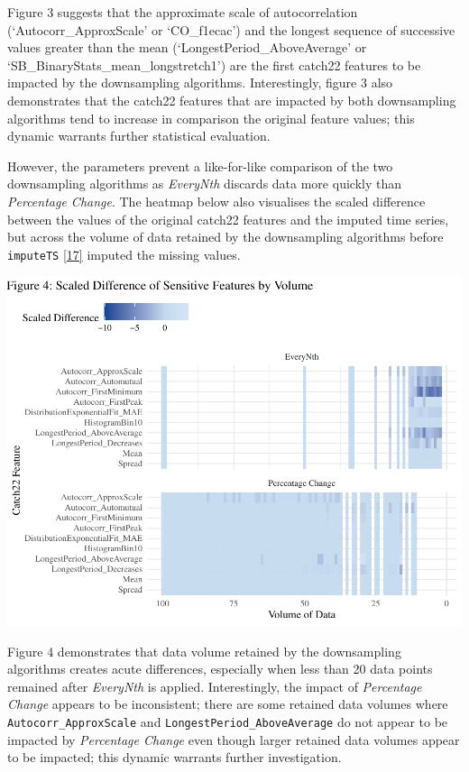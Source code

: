 \documentclass{article}
\begin{document}
Figure 3 suggests that the approximate scale of autocorrelation
(`Autocorr\_ApproxScale' or `CO\_f1ecac') and the longest sequence of
successive values greater than the mean (`LongestPeriod\_AboveAverage'
or `SB\_BinaryStats\_mean\_longstretch1') are the first catch22 features
to be impacted by the downsampling algorithms. Interestingly, figure 3
also demonstrates that the catch22 features that are impacted by both
downsampling algorithms tend to increase in comparison the original
feature values; this dynamic warrants further statistical evaluation.

However, the parameters prevent a like-for-like comparison of the two
downsampling algorithms as \emph{EveryNth} discards data more quickly
than \emph{Percentage Change}. The heatmap below also visualises the
scaled difference between the values of the original catch22 features
and the imputed time series, but across the volume of data retained by
the downsampling algorithms before \texttt{imputeTS}
\protect\hyperlink{ref-imputeTS_R}{{[}17{]}} imputed the missing values.

\includegraphics{210431461_CSC8639_Dissertation_files/figure-latex/Heatmap_vol-1.pdf}

Figure 4 demonstrates that data volume retained by the downsampling
algorithms creates acute differences, especially when less than 20 data
points remained after \emph{EveryNth} is applied. Interestingly, the
impact of \emph{Percentage Change} appears to be inconsistent; there are
some retained data volumes where \texttt{Autocorr\_ApproxScale} and
\texttt{LongestPeriod\_AboveAverage} do not appear to be impacted by
\emph{Percentage Change} even though larger retained data volumes appear
to be impacted; this dynamic warrants further investigation.
\end{document}
